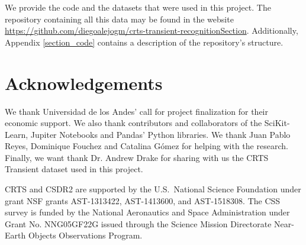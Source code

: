 \documentclass[a4paper,fleqn,usenatbib]{mnras}
\begin{document}
We provide the code and the datasets that were used in this project.
The repository containing all this data may be found in the website \url{https://github.com/diegoalejogm/crts-transient-recognitionSection}. Additionally, Appendix \ref{section_code} contains a description of the
repository's structure.





\section*{Acknowledgements}

We thank Universidad de los Andes' call for project finalization for their economic support.
We also thank contributors and collaborators of the SciKit-Learn, Jupiter Notebooks and Pandas' Python libraries.
We thank Juan Pablo Reyes, Dominique Fouchez and Catalina G\'omez for helping with the research.
Finally, we want thank Dr. Andrew Drake for sharing with us the CRTS Transient dataset used in this project.

CRTS and CSDR2 are supported by the U.S.~National Science 
Foundation under grant NSF grants AST-1313422, AST-1413600, and 
AST-1518308.  The CSS survey is funded by the National Aeronautics
and Space Administration under Grant No. NNG05GF22G issued through
the Science Mission Directorate Near-Earth Objects Observations Program.







\end{document}
